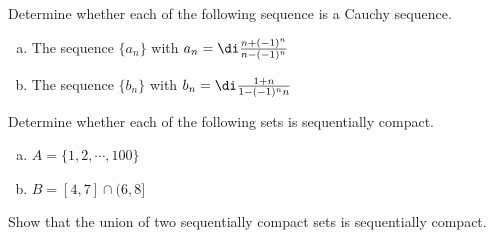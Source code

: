  \atc

 \begin{question}{\themyquestion} 
Determine whether each of the following sequence is a Cauchy sequence.
\begin{enumerate}[(a)]
\item The sequence $\{a_n\}$ with $a_n=\di \frac{n+(-1)^n}{n-(-1)^n}$
\item The sequence $\{b_n\}$ with $b_n=\di \frac{1+  n}{1-(-1)^n n}$

\end{enumerate}
\end{question}
\atc
 \begin{question}{\themyquestion} 
 Determine whether each of the following sets is sequentially compact.
 \begin{enumerate} [(a)]
  \item $A=\{1, 2, \cdots, 100\}$
  \item 
 $B=[4, 7]\cap (6, 8]$

 
 
 \end{enumerate}
\end{question}
 
\atc
 \begin{question}{\themyquestion} 
Show that the union of two sequentially compact sets is sequentially compact. 
\end{question}
